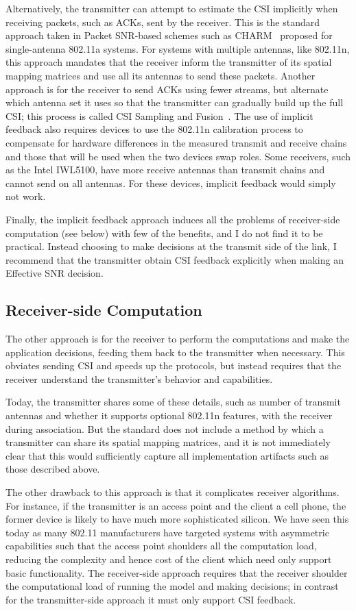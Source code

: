 Alternatively, the transmitter can attempt to estimate the CSI implicitly when receiving packets, such as ACKs, sent by the receiver. This is the standard approach taken in Packet SNR-based schemes such as CHARM~\cite{Judd_CHARM} proposed for single-antenna 802.11a systems. For systems with multiple antennas, like 802.11n, this approach mandates that the receiver inform the transmitter of its spatial mapping matrices and use all its antennas to send these packets. Another approach is for the receiver to send ACKs using fewer streams, but alternate which antenna set it uses so that the transmitter can gradually build up the full CSI; this process is called CSI Sampling and Fusion~\cite{Crepaldi_CSI_SF}. The use of implicit feedback also requires devices to use the 802.11n calibration process to compensate for hardware differences in the measured transmit and receive chains and those that will be used when the two devices swap roles. Some receivers, such as the Intel IWL5100, have more receive antennas than transmit chains and cannot send on all antennas. For these devices, implicit feedback would simply not work. 

Finally, the implicit feedback approach induces all the problems of receiver-side computation (see below) with few of the benefits, and I do not find it to be practical. Instead choosing to make decisions at the transmit side of the link, I recommend that the transmitter obtain CSI feedback explicitly when making an Effective SNR decision.

\subsection{Receiver-side Computation}
The other approach is for the receiver to perform the computations and make the application decisions, feeding them back to the transmitter when necessary. This obviates sending CSI and speeds up the protocols, but instead requires that the receiver understand the transmitter's behavior and capabilities.

Today, the transmitter shares some of these details, such as number of transmit antennas and whether it supports optional 802.11n features, with the receiver during association. But the standard does not include a method by which a transmitter can share its spatial mapping matrices, and it is not immediately clear that this would sufficiently capture all implementation artifacts such as those described above.

The other drawback to this approach is that it complicates receiver algorithms. For instance, if the transmitter is an access point and the client a cell phone, the former device is likely to have much more sophisticated silicon. We have seen this today as many 802.11 manufacturers have targeted systems with asymmetric capabilities such that the access point shoulders all the computation load, reducing the complexity and hence cost of the client which need only support basic functionality. The receiver-side approach requires that the receiver shoulder the computational load of running the model and making decisions; in contrast for the transmitter-side approach it must only support CSI feedback.

